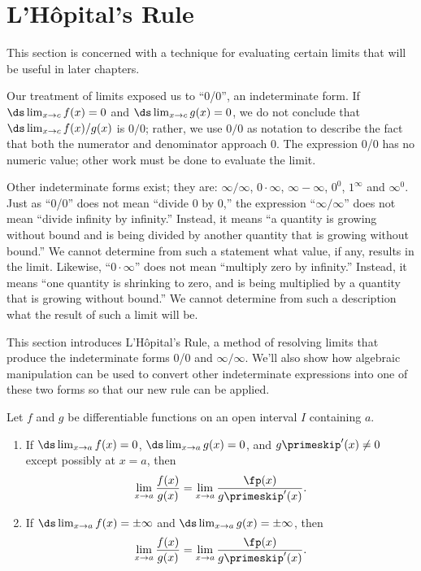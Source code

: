 \section{L'H\^opital's Rule}\label{sec:lhopitals_rule}

This section is concerned with a technique for evaluating certain limits that will be useful in later chapters.

Our treatment of limits exposed us to ``0/0'', an indeterminate form. If $\ds \lim_{x\to c}f(x)=0$ and $\ds \lim_{x\to c} g(x) =0$, we do not conclude that $\ds \lim_{x\to c} f(x)/g(x)$ is $0/0$; rather, we use $0/0$ as notation to describe the fact that both the numerator and denominator approach 0. The expression 0/0 has no numeric value; other work must be done to evaluate the limit.

Other indeterminate forms exist; they are: $\infty/\infty$, $0\cdot\infty$, $\infty-\infty$, $0^0$, $1^\infty$ and $\infty^0$. Just as ``0/0'' does not mean ``divide 0 by 0,'' the expression ``$\infty/\infty$'' does not mean ``divide infinity by infinity.'' Instead, it means ``a quantity is growing without bound and is being divided by another quantity that is growing without bound.'' We cannot determine from such a statement what value, if any, results in the limit. Likewise, ``$0\cdot \infty$'' does not mean ``multiply zero by infinity.'' Instead, it means ``one quantity is shrinking to zero, and is being multiplied by a quantity that is growing without bound.'' We cannot determine from such a description what the result of such a limit will be.

This section introduces L'H\^opital's Rule, a method of resolving limits that produce the indeterminate forms 0/0 and $\infty/\infty$. We'll also show how algebraic manipulation can be used to convert other indeterminate expressions into one of these two forms so that our new rule can be applied.

{Let $f$ and $g$ be differentiable functions on an open interval $I$ containing $a$.
\begin{enumerate}
\item If $\ds\lim_{x\to a}f(x)=0$, $\ds\lim_{x\to a}g(x)=0$, and $g\primeskip'(x)\neq 0$ except possibly at $x=a$, then \[\lim_{x\to a}\frac{f(x)}{g(x)}=\lim_{x\to a} \frac{\fp(x)}{g\primeskip'(x)}.\]
\item If  $\ds\lim_{x\to a}f(x)=\pm\infty$ and $\ds\lim_{x\to a}g(x)=\pm\infty$, then \[\lim_{x\to a}\frac{f(x)}{g(x)}=\lim_{x\to a} \frac{\fp(x)}{g\primeskip'(x)}.\]
\end{enumerate}}

